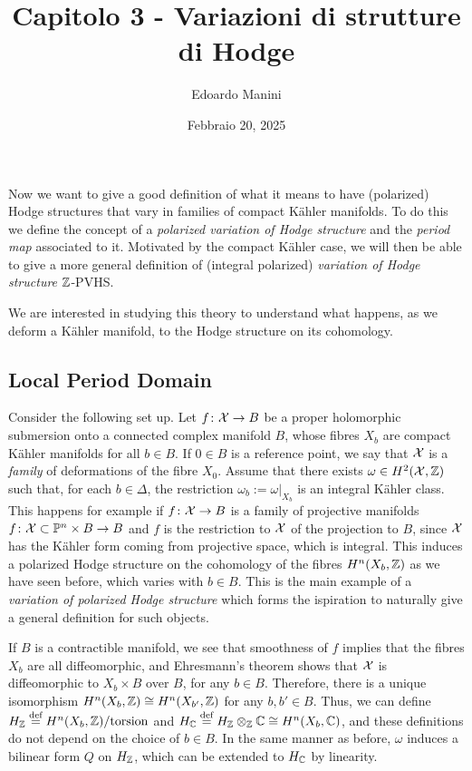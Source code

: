 \documentclass[../main.tex]{subfiles}
\title{Capitolo 3 - Variazioni di strutture di Hodge}
\author{Edoardo Manini}
\date{Febbraio 20, 2025}
\begin{document}
\ifSubfilesClassLoaded{
\maketitle
\tableofcontents
}{}


Now we want to give a good definition of what it means to have (polarized) Hodge structures that vary in families of compact K\"{a}hler manifolds. To do this we define the concept of a \emph{polarized variation of Hodge structure} and the \emph{period map} associated to it. Motivated by the compact K\"{a}hler case, we will then be able to give a more general definition of (integral polarized) \emph{variation of Hodge structure} $\mathbb{Z}$-PVHS. 

We are interested in studying this theory to understand what happens, as we deform a K\"{a}hler manifold, to the Hodge structure on its cohomology.


\subsection{Local Period Domain} \label{sect:locmap}

Consider the following set up. 
Let $f\colon \mathcal{X} \to B$ be a proper holomorphic submersion onto a connected complex manifold $B$, whose fibres $X_b$ are compact K\"{a}hler manifolds for all $b \in B$. If $0 \in B$ is a reference point, we say that $ \mathcal{X} $ is a \emph{family} of deformations of the fibre $X_0$.
Assume that there exists $\omega \in H^2(\mathcal{X},\mathbb{Z})$ such that, for each $b \in \Delta$, the restriction $\omega_b := \omega|_{X_b}$ is an integral K\"{a}hler class. This happens for example if  $f\colon \mathcal{X} \to B$ is a family of projective manifolds $f\colon \mathcal{X} \subset \mathbb{P}^n \times B \to B$ and $f$ is the restriction to $\mathcal{X}$ of the projection to $B$, since $\mathcal{X}$ has the K\"{a}hler form coming from projective space, which is integral.
This induces a polarized Hodge structure on the cohomology of the fibres $H^n(X_b,\mathbb{Z})$ as we have seen before, which varies with $b \in B$. This is the main example of a \emph{variation of polarized Hodge structure} which forms the ispiration to naturally give a general definition for such objects.

If $B$ is a contractible manifold, we see that smoothness of $f$ implies that the fibres $X_b$ are all diffeomorphic, and Ehresmann's theorem \cite[Thm. 9.3]{Voi07} shows that $\mathcal{X}$ is diffeomorphic to $X_b \times B$ over $B$, for any $b \in B$. 
Therefore, there is a unique isomorphism $H^n(X_b,\mathbb{Z}) \cong H^n(X_{b'},\mathbb{Z})$ for any $b,b'\in B$. 
Thus, we can define $H_{\mathbb{Z}} \stackrel{\text{def}}{=} H^n(X_b,\mathbb{Z})/\mathrm{torsion}$ and $H_{\mathbb{C}} \stackrel{\text{def}}{=} H_{\mathbb{Z}} \otimes_{\mathbb{Z}} \mathbb{C} \cong H^n(X_b,\mathbb{C})$, and these definitions do not depend on the choice of $b \in B$. 
In the same manner as before, $\omega$ induces a bilinear form $Q$ on $H_{\mathbb{Z}}$, which can be extended to $H_{\mathbb{C}}$ by linearity.
\end{document}

